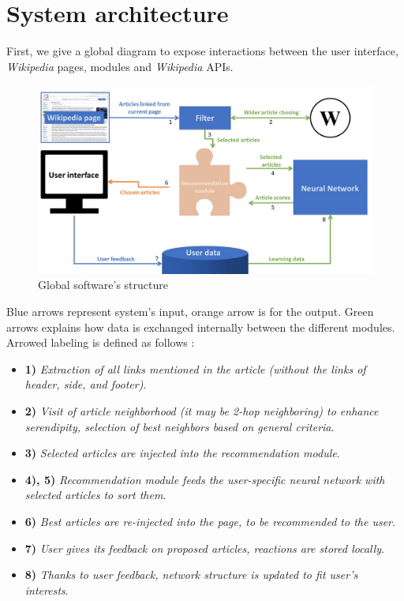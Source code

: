 \documentclass[11pt]{article}
\theoremstyle{plain}
\theoremstyle{definition}
\theoremstyle{remark}
\begin{document}
\section{System architecture}

First, we give a global diagram to expose interactions between the user interface, \textit{Wikipedia} pages, modules and \textit{Wikipedia} APIs. 

\begin{figure}[h!]
	\centering
    \includegraphics[width=400pt]{diagram.png}
    \caption{Global software's structure}
    \label{arch_glo}
\end{figure}

Blue arrows represent system's input, orange arrow is for the output. Green arrows explains how data is exchanged internally between the different modules. Arrowed labeling is defined as follows :
\begin{itemize}
\item \textbf{1)} \textit{Extraction of all links mentioned in the article (without the links of header, side, and footer)}.
\item \textbf{2)} \textit{Visit of article neighborhood (it may be 2-hop neighboring) to enhance serendipity, selection of best neighbors based on general criteria}.
\item \textbf{3)} \textit{Selected articles are injected into the recommendation module}.
\item \textbf{4), 5)} \textit{Recommendation module feeds the user-specific neural network with selected articles to sort them}.
\item \textbf{6)} \textit{Best articles are re-injected into the page, to be recommended to the user}.
\item \textbf{7)} \textit{User gives its feedback on proposed articles, reactions are stored locally}.
\item \textbf{8)} \textit{Thanks to user feedback, network structure is updated to fit user's interests}.
\end{itemize}
\end{document}
